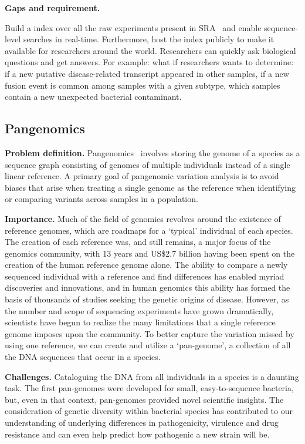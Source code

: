 \noindent
{\bf Gaps and requirement.}


\begin{rproblem}
Build a \kmer index over all the raw experiments present in SRA~\cite{kodama2012sequence} and enable sequence-level searches in real-time. Furthermore, host the index publicly to make it available for researchers around the world. Researchers can quickly ask biological questions and get answers. For example: what if researchers wants to determine: if a new putative disease-related transcript appeared in other samples, if a new fusion event is
common among samples with a given subtype, which samples contain a new unexpected bacterial contaminant. 
\label{rprob:peppermint2}
\end{rproblem}

\subsection{Pangenomics}

{\bf Problem definition.}
Pangenomics~\cite{garrison2018variation} involves storing the genome of a species as a sequence graph consisting of genomes of multiple individuals instead of a single linear reference. A primary goal of pangenomic variation analysis is to avoid biases that arise when treating a single genome as the reference when identifying or comparing variants across samples in a population.

\noindent
{\bf Importance.}
Much of the field of genomics revolves around the existence of reference genomes, which are roadmaps for a ‘typical’ individual of each species. The creation of each reference was, and still remains, a major focus of the genomics community, with 13 years and US\$2.7 billion having been spent on the creation of the human reference genome alone. The ability to compare a newly sequenced individual with a reference and find differences has enabled myriad discoveries and innovations, and in human genomics this ability has formed the basis of thousands of studies seeking the genetic origins of disease. However, as the number and scope of sequencing experiments have grown dramatically, scientists have begun to realize the many limitations that a single reference genome imposes upon the community. To better capture the variation missed by using one reference, we can create and utilize a ‘pan-genome’, a collection of all the DNA sequences that occur in a species.

\noindent
{\bf Challenges.}
Cataloguing the DNA from all individuals in a species is a daunting task. The first pan-genomes were developed for small, easy-to-sequence bacteria, but, even in that context, pan-genomes provided novel scientific insights. The consideration of genetic diversity within bacterial species has contributed to our understanding of underlying differences in pathogenicity, virulence and drug resistance and can even help predict how pathogenic a new strain will be.

